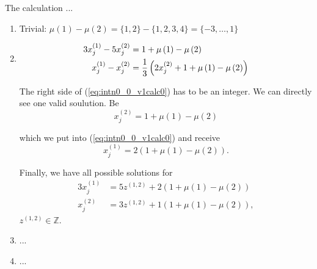 The calculation ...
\begin{enumerate}
	\item Trivial: $\mu\left(1\right) - \mu\left(2\right) = \{1,2\} - \{1,2,3,4\} = \{-3,\dots,1\}$
	\item 
		\begin{alignat}{3}
			3x_{j}^{\left(1\right)} - 5x_{j}^{\left(2\right)} &= 1 + \mu\left(1\right) - \mu\left(2\right) \notag \\
			x_{j}^{\left(1\right)} - x_{j}^{\left(2\right)} &= \frac{1}{3}\left(2x_{j}^{\left(2\right)} + 1 + \mu\left(1\right) - \mu\left(2\right)\right) \label{eq:intn0_0_v1calc0}
		\end{alignat}
	
		The right side of (\ref{eq:intn0_0_v1calc0}) has to be an integer. We can directly see one valid soulution. Be
		\begin{equation}
			x_{j}^{\left(2\right)} = 1 + \mu\left(1\right) - \mu\left(2\right)
		\label{eq:intn0_0_v1calc1}
		\end{equation}
		
		which we put into (\ref{eq:intn0_0_v1calc0}) and receive
		\begin{equation}
			 x_{j}^{\left(1\right)} = 2\left(1 + \mu\left(1\right) - \mu\left(2\right)\right).
		\label{eq:intn0_0_v1calc2}
		\end{equation}

		Finally, we have all possible solutions for
		\begin{alignat}{3}
			x_{j}^{\left(1\right)} &= 5z^{\left(1,2\right)} + 2\left(1 + \mu\left(1\right) - \mu\left(2\right)\right) \label{eq:int0_0_v1calcsol1}\\
			x_{j}^{\left(2\right)} &= 3z^{\left(1,2\right)} + 1\left(1 + \mu\left(1\right) - \mu\left(2\right)\right), \label{eq:int0_0_v1calcsol2}
		\end{alignat}
		$z^{\left(1,2\right)} \in \mathbb{Z}$.

	\item ...
	\item ...
\label{en:n0_0_v1calc}
\end{enumerate}
